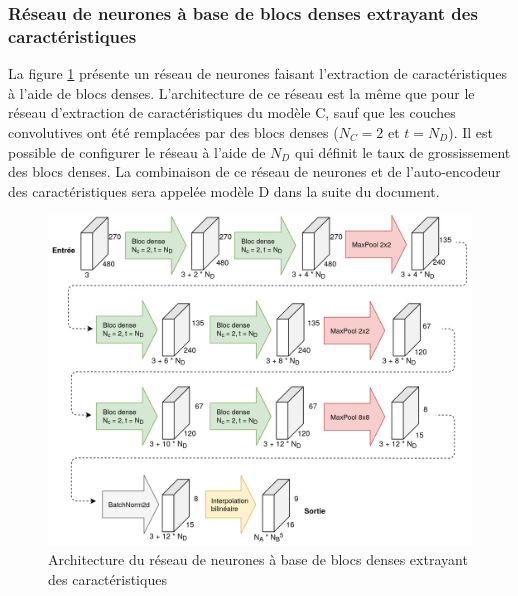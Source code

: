\subsubsection{Réseau de neurones à base de blocs denses extrayant des caractéristiques}
    La figure \ref{fig:architecture_small_cnn_dense_bloc} présente un réseau de neurones faisant l'extraction de caractéristiques à l'aide de blocs denses. L'architecture de ce réseau est la même que pour le réseau d'extraction de caractéristiques du modèle C, sauf que les couches convolutives ont été remplacées par des blocs denses (\(N_C = 2\) et  \(t = N_D\)). Il est possible de configurer le réseau à l'aide de \(N_D\) qui définit le taux de grossissement des blocs denses. La combinaison de ce réseau de neurones et de l'auto-encodeur des caractéristiques sera appelée modèle D dans la suite du document.
    \begin{figure}[H]
        \centering
        \includegraphics[width=17cm]{images/Architecture_SmallCnnWithAutoencoderDenseBlocks.png}
        \caption{Architecture du réseau de neurones à base de blocs denses extrayant des caractéristiques}
        \label{fig:architecture_small_cnn_dense_bloc}
    \end{figure}

